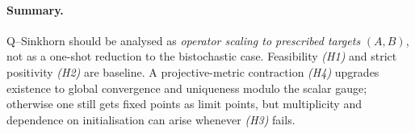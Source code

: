 \documentclass[10pt]{article}
\theoremstyle{plain}
\theoremstyle{definition}
\theoremstyle{remark}
\begin{document}
\paragraph{Summary.}
Q--Sinkhorn should be analysed as \emph{operator scaling to prescribed targets} $(A,B)$, not as a one-shot reduction to the bistochastic case. Feasibility \emph{(H1)} and strict positivity \emph{(H2)} are baseline. A projective-metric contraction \emph{(H4)} upgrades existence to global convergence and uniqueness modulo the scalar gauge; otherwise one still gets fixed points as limit points, but multiplicity and dependence on initialisation can arise whenever \emph{(H3)} fails.





\end{document}
